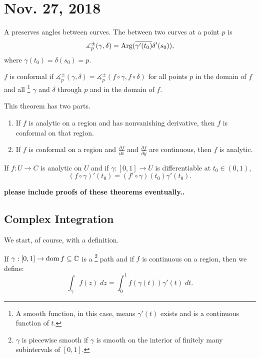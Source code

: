 \section{Nov. 27, 2018}

A  preserves angles between curves.
The  between two curves at a point $p$ is 
\[ \measuredangle_p^{\pm}(\gamma, \delta) = 
{\operatorname{Arg}} (\overline{\gamma'(t_0)} \delta'(s_0)),\]
where $\gamma(t_0) = \delta(s_0) = p$.

\begin{definition}
    $f$ is conformal if $\measuredangle_p^{\pm}(\gamma, \delta) = \measuredangle_p^{\pm}(f \circ \gamma, f \circ \delta)$ 
    for all points $p$ in the domain of $f$ and all \footnote{A smooth function, in this case, means
    $\gamma'(t)$ exists and is a continuous function of $t$.} $\gamma$
    and $\delta$ through $p$ and in the domain of $f$.
\end{definition}
 
\begin{theorem}
    This theorem has two parts.
    \begin{enumerate}
        \item If $f$ is analytic on a region and has nonvanishing
            derivative, then $f$ is conformal on that region.

        \item If $f$ is conformal on a region and 
            $\frac{\partial f}{\partial x}$ and 
            $\frac{\partial f}{\partial y}$ are continuous,
            then $f$ is analytic.
    \end{enumerate}
\end{theorem}

\begin{lemma}
    If $f : U \to C$ is analytic on $U$ and if $\gamma : [0,1]
    \to U$ is differentiable at $t_0 \in (0,1)$,
    \[ (f \circ \gamma)' (t_0) = (f' \circ \gamma) (t_0)
    \gamma'(t_0). \]
\end{lemma}

\textbf{please include proofs of these theorems eventually..}



\subsection{Complex Integration}
We start, of course, with a definition.

\begin{definition}
    If $\gamma: [0,1] \to \operatorname{dom}{f} \subseteq \operatorname{\mathbb{C}}$ is a 
    \footnote{$\gamma$ is piecewise 
    smooth if $\gamma$ is smooth on the interior of finitely
    many subintervals of $[0,1]$.}
    path and if $f$ is continuous on a region,
    then we define:
    \[ \int_{\gamma} f(z) \; dz = \int_0^1 f(\gamma(t))\gamma'(t) \;dt. \]

\end{definition}

